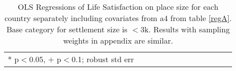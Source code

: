 \documentclass[11pt, letterpaper]{article}
\begin{document}
\begin{spacing}{1.9}
\begin{spacing}{.9} \begin{table}[H]\centering   \begin{scriptsize} \begin{tabular}{p{.5in}p{.5in}p{.5in}p{.5in}p{.5in}p{.5in}p{.5in}p{.5in}p{.5in}p{.5in}p{.5
                                                                      in}p{.5in}p{.5
                                                                      in}}\hline
                                                                      
                                                                      \hline *
                                                                      p$<$0.05,
                                                                      $+$
                                                                      p$<$0.1;
                                                                      robust std
                                                                      err \end{tabular}\end{scriptsize}\caption{\label{a4cou}OLS
                                                                    Regressions
                                                                    of Life Satisfaction on
                                                                    place size
                                                                    for each
                                                                    country
                                                                    separately
                                                                    including
                                                                    covariates
                                                                    from a4 from
                                                                    table
                                                                    \ref{regA}. %
   Base category for settlement size is $<$3k.                                                               Results with sampling weights in appendix are similar.  
                                                           }\end{table} \end{spacing}




\end{spacing}
\end{document}
